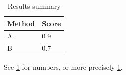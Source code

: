 \begin{table}[htbp]
\centering
\caption{Results summary}
\label{tab:results}
\begin{tabular}{ll}
\toprule
Method & Score \\
\midrule
A & 0.9 \\
B & 0.7 \\
\bottomrule
\end{tabular}
\end{table}

See \ref{tab:results} for numbers, or more precisely \cref{tab:results}.

